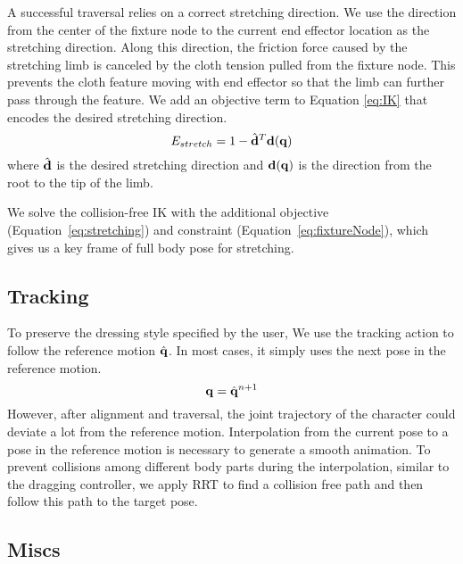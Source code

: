 A successful traversal relies on a correct stretching direction. We use the direction from the center of the fixture node to the current end effector location as the stretching direction. Along this direction, the friction force caused by the stretching limb is canceled by the cloth tension pulled from the fixture node. This prevents the cloth feature moving with end effector so that the limb can further pass through the feature. We add an objective term to Equation \ref{eq:IK} that encodes the desired stretching direction.
\begin{equation}
  E_{stretch} = 1 - \hat{\mathbf{d}}^T\mathbf{d(q)}
  \label{eq:stretching}
\end{equation}
where $\hat{\mathbf{d}}$ is the desired stretching direction and $\mathbf{d(q)}$ is the direction from the root to the tip of the limb.

We solve the collision-free IK with the additional objective (Equation~\ref{eq:stretching}) and constraint (Equation~\ref{eq:fixtureNode}), which gives us a key frame of full body pose for stretching.


\subsection{Tracking}

To preserve the dressing style specified by the user, We use the tracking action to follow the reference motion $\hat{\mathbf{q}}$. In most cases, it simply uses the next pose in the reference motion.
\begin{displaymath}
\mathbf{q} = \hat{\mathbf{q}}^{n+1}
\end{displaymath}
However, after alignment and traversal, the joint trajectory of the character could deviate a lot from the reference motion. Interpolation from the current pose to a pose in the reference motion is necessary to generate a smooth animation. To prevent collisions among different body parts during the interpolation, similar to the dragging controller, we apply RRT \cite{} to find a collision free path and then follow this path to the target pose.


\subsection{Miscs}

